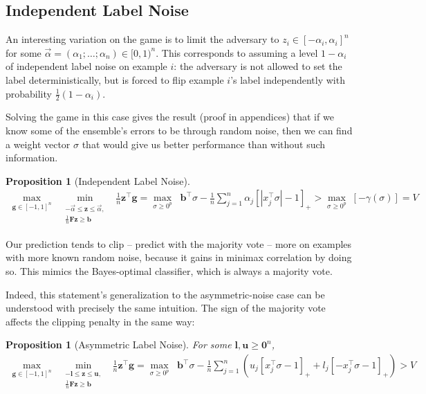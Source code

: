 \documentclass{colt2019} %
\newtheorem{prop}[thm]{Proposition}
\newcommand{\vF}{\mathbf{F}}
\newcommand{\vb}{\mathbf{b}}
\newcommand{\vu}{\mathbf{u}}
\newcommand{\vl}{\mathbf{l}}
\newcommand{\vg}{\mathbf{g}}
\newcommand{\vz}{\mathbf{z}}
\newcommand{\valpha}{\vec{\alpha}}
\newcommand{\vzero}{\mathbf{0}}
\newcommand{\abs}[1]{\left| #1 \right|}
\newcommand{\lrp}[1]{\left(#1\right)}
\begin{document}
\subsection{Independent Label Noise}

An interesting variation on the game is to limit the adversary to 
$z_i \in [-\alpha_i,\alpha_i]^n$ for some $\vec{\alpha} = (\alpha_1 ; \dots ; \alpha_n) \in [0,1)^n$. 
This corresponds to assuming a level $1 - \alpha_i$ of independent label noise on example $i$: 
the adversary is not allowed to set the label deterministically, 
but is forced to flip example $i$'s label independently 
with probability $\frac{1}{2}(1 - \alpha_i)$. 

Solving the game in this case gives the result (proof in appendices) 
that if we know some of the ensemble's errors to be through random noise, 
then we can find a weight vector $\sigma$ that would give us better performance than 
without such information. 
\begin{prop}[Independent Label Noise]
\label{prop:labnoise}
\begin{align*}
\max_{\vg \in [-1,1]^n} \;\;\min_{\substack{ - \valpha \leq \vz \leq \valpha , \\ 
\frac{1}{n} \vF \vz \geq \vb }} \;\; \frac{1}{n} \vz{^\top} \vg 
= \max_{\sigma \geq 0^p } \;\;\vb^\top \sigma - \frac{1}{n} \sum_{j=1}^n \alpha_j \left[ \abs{x_{j}^\top \sigma} - 1 \right]_{+}
> \max_{\sigma \geq 0^p } \;[- \gamma (\sigma)]
= V 
\end{align*}
\end{prop}
Our prediction tends to clip -- predict with the majority vote -- more on examples with more known random noise, 
because it gains in minimax correlation by doing so. 
This mimics the Bayes-optimal classifier, which is always a majority vote. 

Indeed, this statement's generalization to the asymmetric-noise case 
can be understood with precisely the same intuition. 
The sign of the majority vote affects the clipping penalty in the same way:
\begin{prop}[Asymmetric Label Noise] 
For some $\vl, \vu \geq \vzero^n$,
\begin{align*}
\max_{\vg \in [-1,1]^n} \;\;\min_{\substack{ -\vl \leq \vz \leq \vu , \\ 
\frac{1}{n} \vF \vz \geq \vb }} \;\; \frac{1}{n} \vz{^\top} \vg 
= \max_{\sigma \geq 0^p } \;\;\vb^\top \sigma - \frac{1}{n} \sum_{j=1}^n \lrp{ u_j \left[ x_{j}^\top \sigma - 1 \right]_{+} + l_j \left[ - x_{j}^\top \sigma - 1 \right]_{+} }
> V 
\end{align*}
\end{prop}
\end{document}
